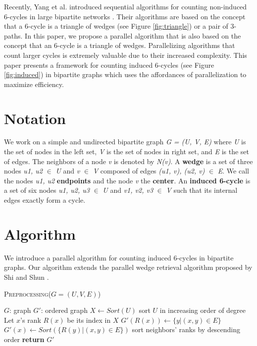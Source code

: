\documentclass[11pt]{article}
\begin{document}
Recently, Yang et al. introduced sequential algorithms for counting non-induced 6-cycles in large bipartite networks \cite{yang2020efficient}.
Their algorithms are based on the concept that a 6-cycle is a triangle of wedges (see Figure \ref{fig:triangle}) or a pair of 3-paths.
In this paper, we propose a parallel algorithm that is also based on the concept that an 6-cycle is a triangle of wedges.
Parallelizing algorithms that count larger cycles is extremely valuable due to their increased complexity.
This paper presents a framework for counting induced 6-cycles (see Figure \ref{fig:induced}) in bipartite graphs which uses the affordances of parallelization to maximize efficiency.

\section{Notation}
We work on a simple and undirected bipartite graph \textit{G = (U, V, E)} where \textit{U} is the set of nodes in the left set, \textit{V} is the set of nodes in right set, and \textit{E} is the set of edges.
The neighbors of a node \textit{v} is denoted by \textit{N(v)}.
A \textbf{wedge} is a set of three nodes \textit{u1, u2} $\in$ \textit{U} and \textit{v} $\in$ \textit{V} composed of edges \textit{(u1, v), (u2, v)} $\in$ \textit{E}. 
We call the nodes \textit{u1, u2} \textbf{endpoints} and the node \textit{v} the \textbf{center}.
An \textbf{induced 6-cycle} is a set of six nodes \textit{u1, u2, u3} $\in$ \textit{U} and \textit{v1, v2, v3} $\in$ \textit{V} such that its internal edges exactly form a cycle.

\section{Algorithm}

We introduce a parallel algorithm for counting induced 6-cycles in bipartite graphs.
Our algorithm extends the parallel wedge retrieval algorithm proposed by Shi and Shun \cite{shi2019parallel}.

\setlength{\textfloatsep}{0pt}
\begin{algorithm}[H]
\caption{\textsc{Preprocessing($G = (U, V, E)$)}}
\label{alg:Preprocessing}
\begin{algorithmic}[1]
    \Input $G$: graph
    \Output $G'$: ordered graph
        \State $X \gets Sort(U)$ \Comment sort $U$ in increasing order of degree
        \State Let $x$'s rank $R(x)$ be its index in $X$
                \State $G'(R(x)) \gets \{y | (x, y) \in E\}$
            \Else
                \State $G'(x) \gets Sort(\{R(y) | (x, y) \in E\})$ \Comment sort neighbors' ranks by descending order
            \EndIf
        \EndFor
        \State \textbf{return} $G'$
\end{algorithmic}
\end{algorithm}
\end{document}
